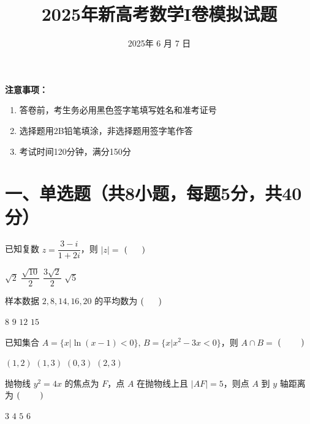 \documentclass[UTF8,12pt]{exam}
\title{2025年新高考数学I卷模拟试题}
\author{}
\date{ 2025年 6 月 7 日}
\DeclarePairedDelimiter{\paren}{(}{)} %
\begin{document}
\everymath{\displaystyle}
\maketitle

\begin{center}
\textbf{注意事项：}
\begin{enumerate}
  \item 答卷前，考生务必用黑色签字笔填写姓名和准考证号
  \item 选择题用2B铅笔填涂，非选择题用签字笔作答
  \item 考试时间120分钟，满分150分
\end{enumerate}
\end{center}

\section*{一、单选题（共8小题，每题5分，共40分）}
\begin{questions}
\question 已知复数 $z=\dfrac{3-i}{1+2i}$，则 $|z|=  $ \hfill $\paren{ \ \ \ \ \   } $
\begin{choices}
\choice $\sqrt{2}$  
\choice $\dfrac{\sqrt{10}}{2}$ 
\choice $\dfrac{3\sqrt{2}}{2}$ 
\choice $\sqrt{5}$
\end{choices}

\question 样本数据 $2, 8, 14, 16, 20$ 的平均数为 \hfill  $\paren{\ \ \ \ \ }$
\begin{choices}
\choice $8$
\choice $9$
\choice $12$
\choice $15$
\end{choices}

\question 已知集合 $A=\{x| \ln(x-1) < 0\}$, $B=\{x| x^2-3x<0\}$，则 $A\cap B=$ \hfill $\paren{\ \ \ \ \ \ \ }$
\begin{choices}
\choice $(1,2)$
\choice $(1,3)$
\choice $(0,3)$
\choice $(2,3)$
\end{choices}

\question 抛物线 $y^2=4x$ 的焦点为 $F$，点 $A$ 在抛物线上且 $|AF|=5$，则点 $A$ 到 $y$ 轴距离为  \hfill $\paren{\ \ \ \ \ \ \ }$
\begin{choices}
\choice $3$
\choice $4$
\choice $5$
\choice $6$
\end{choices}

\end{questions}
\end{document}

